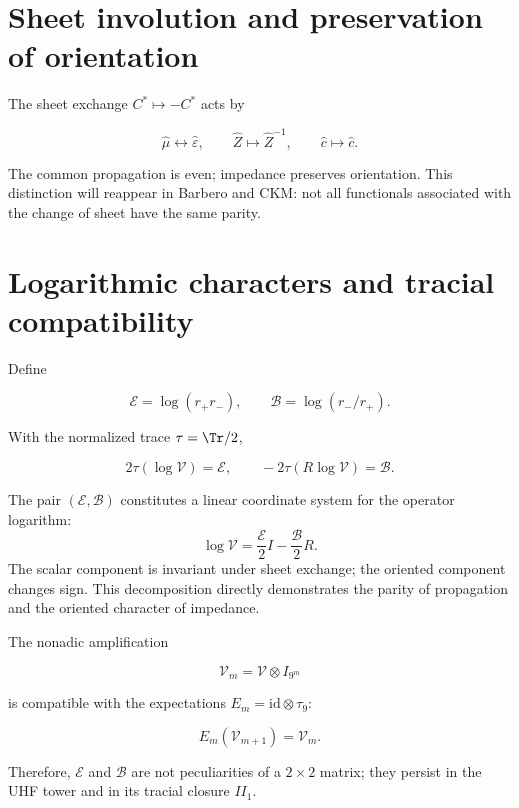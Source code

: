 \section{Sheet involution and preservation of orientation}

The sheet exchange \(C^*\mapsto-C^*\) acts by

\begin{equation}
\widehat\mu\longleftrightarrow\widehat\varepsilon,\qquad
\widehat Z\longmapsto\widehat Z^{-1},
\qquad
\widehat c\longmapsto\widehat c.
\label{eq:vacuum-sheet}
\end{equation}

The common propagation is even; impedance preserves orientation.
This distinction will reappear in Barbero and CKM: not all functionals
associated with the change of sheet have the same parity.

\section{Logarithmic characters and tracial compatibility}

Define

\[
\mathcal E=\log(r_+r_-),\qquad
\mathcal B=\log(r_-/r_+).
\]

With the normalized trace \(\tau=\Tr/2\),

\begin{equation}
2\tau(\log\mathcal V)=\mathcal E,
\qquad
-2\tau(R\log\mathcal V)=\mathcal B.
\label{eq:vacuum-traces}
\end{equation}

The pair \((\mathcal E,\mathcal B)\) constitutes a linear coordinate system for the operator
logarithm:
\begin{equation}
\log\mathcal V
=\frac{\mathcal E}{2}I-\frac{\mathcal B}{2}R.
\label{eq:vacuum-log-decomposition}
\end{equation}
The scalar component is invariant under sheet exchange; the
oriented component changes sign. This decomposition directly
demonstrates the parity of propagation and the oriented character of
impedance.

The nonadic amplification

\[
\mathcal V_m=\mathcal V\otimes I_{9^m}
\]

is compatible with the expectations \(E_m=\mathrm{id}\otimes\tau_9\):

\[
E_m(\mathcal V_{m+1})=\mathcal V_m.
\]

Therefore, \(\mathcal E\) and \(\mathcal B\) are not peculiarities of a \(2\times2\) matrix; they persist in the UHF tower and in its tracial closure \(II_1\).

